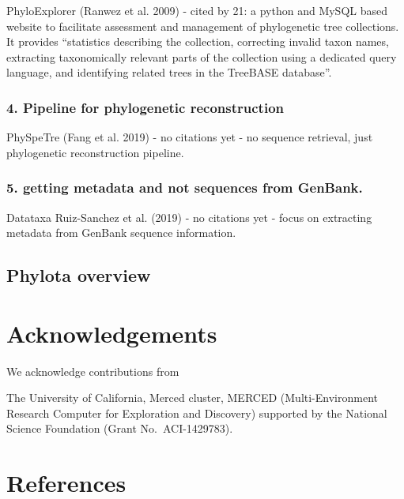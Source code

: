 \documentclass[draft]{ametsoc}
\begin{document}
PhyloExplorer (Ranwez et al. 2009) - cited by 21: a python and MySQL
based website to facilitate assessment and management of phylogenetic
tree collections. It provides ``statistics describing the collection,
correcting invalid taxon names, extracting taxonomically relevant parts
of the collection using a dedicated query language, and identifying
related trees in the TreeBASE database''.

\hypertarget{pipeline-for-phylogenetic-reconstruction}{%
\subsubsection{4. Pipeline for phylogenetic
reconstruction}\label{pipeline-for-phylogenetic-reconstruction}}

PhySpeTre (Fang et al. 2019) - no citations yet - no sequence retrieval,
just phylogenetic reconstruction pipeline.

\hypertarget{getting-metadata-and-not-sequences-from-genbank.}{%
\subsubsection{5. getting metadata and not sequences from
GenBank.}\label{getting-metadata-and-not-sequences-from-genbank.}}

Datataxa Ruiz-Sanchez et al. (2019) - no citations yet - focus on
extracting metadata from GenBank sequence information.

\hypertarget{phylota-overview}{%
\subsection{Phylota overview}\label{phylota-overview}}

\hypertarget{acknowledgements}{%
\section{Acknowledgements}\label{acknowledgements}}

We acknowledge contributions from

The University of California, Merced cluster, MERCED (Multi-Environment
Research Computer for Exploration and Discovery) supported by the
National Science Foundation (Grant No.~ACI-1429783).

\hypertarget{references}{%
\section*{References}\label{references}}
\end{document}

